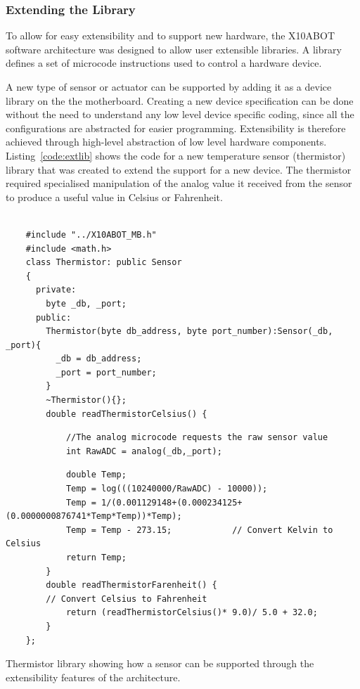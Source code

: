 	\subsubsection{Extending the Library} %
	\label{ssub:extending_the_library}
	
	To allow for easy extensibility and to support new hardware, the X10ABOT software architecture was designed to allow user extensible libraries. A library defines a set of microcode instructions used to control a hardware device.
	
	A new type of sensor or actuator can be supported by adding it as a device library on the the \xten motherboard. Creating a new device specification can be done without the need to understand any low level device specific coding, since all the configurations are abstracted for easier programming. Extensibility is therefore achieved through high-level abstraction of low level hardware components.
    Listing~\ref{code:extlib} shows the code for a new temperature sensor (thermistor) library that was created to extend the \xten support for a new device. The thermistor required specialised manipulation of the analog value it received from the sensor to produce a useful value in Celsius or Fahrenheit.
    
    \begin{listing}
    \footnotesize
    {\fontsize{8}{6}\selectfont
    \begin{verbatim}

    #include "../X10ABOT_MB.h"
    #include <math.h>
    class Thermistor: public Sensor
    {
      private:
        byte _db, _port;
      public:
        Thermistor(byte db_address, byte port_number):Sensor(_db, _port){
          _db = db_address;
          _port = port_number;
        }
        ~Thermistor(){};
        double readThermistorCelsius() {
        \end{verbatim}
        \begin{verbatim}
            //The analog microcode requests the raw sensor value
            int RawADC = analog(_db,_port); 
        \end{verbatim}
        \begin{verbatim}
            double Temp;
            Temp = log(((10240000/RawADC) - 10000));
            Temp = 1/(0.001129148+(0.000234125+(0.0000000876741*Temp*Temp))*Temp);
            Temp = Temp - 273.15;            // Convert Kelvin to Celsius
            return Temp;
        }
        double readThermistorFarenheit() {
        // Convert Celsius to Fahrenheit
            return (readThermistorCelsius()* 9.0)/ 5.0 + 32.0;
        }
    };

    \end{verbatim}
    }
    \caption{Thermistor library showing how a sensor can be supported through the extensibility features of the \xten architecture.} \label{code:extlib}
    \end{listing}
    
